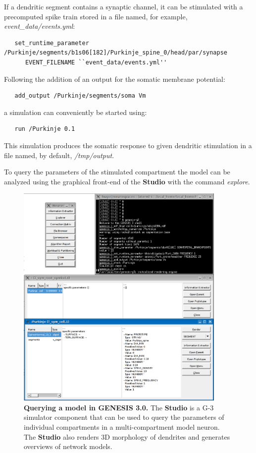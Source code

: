 \documentclass{article}
\begin{document}

If a dendritic segment contains a synaptic channel, it can be
stimulated with a precomputed spike train stored in a file named, for
example, {\it event\_data/events.yml}:

\begin{verbatim}
   set_runtime_parameter /Purkinje/segments/b1s06[182]/Purkinje_spine_0/head/par/synapse
      EVENT_FILENAME ``event_data/events.yml''
\end{verbatim}

Following the addition of an output for the somatic membrane
potential:
\begin{verbatim}
   add_output /Purkinje/segments/soma Vm
\end{verbatim}
a simulation can conveniently be started using:
\begin{verbatim}
   run /Purkinje 0.1
\end{verbatim}
This simulation produces the somatic response to given dendritic
stimulation in a file named, by default, {\it /tmp/output}.

To query the parameters of the stimulated compartment the model can 
be analyzed using the graphical front-end of the {\bf Studio}
with the command {\it explore}.

\begin{figure}[h!]
  \begin{center}
    \includegraphics[width=4in]{figures/studio-screenshot.eps}
  \end{center}
  \caption{ {\bf Querying a model in GENESIS 3.0.} The {\bf Studio} is
    a G-3 simulator component that can
    be used to query the parameters of individual compartments in a
    multi-compartment model neuron. The {\bf Studio} also renders 3D
    morphology of dendrites and generates overviews of network models.
  }
  \label{fig:cbi-studio}
\end{figure}
\end{document}
